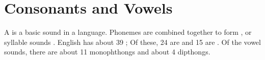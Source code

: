 

\section{Consonants and Vowels}
A  is a basic sound in a language.
Phonemes are combined together to form , or syllable sounds .
English has about {39} ;
Of these, {24} are  and {15} are .
Of the vowel sounds, there are about {11} {monophthongs} %
and about {4} {dipthongs}.  %

